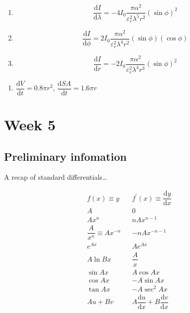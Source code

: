 \documentclass[
]{book}
\providecommand{\tightlist}{%
  \setlength{\itemsep}{0pt}\setlength{\parskip}{0pt}}
\begin{document}
\begin{enumerate}
\def\labelenumi{\alph{enumi}.}
\tightlist
\item
  \begin{equation*}
  \dfrac{\textrm{d}I}{\textrm{d}\lambda}= -4I_0 \frac{\pi \alpha ^2}{\varepsilon _r^2 \lambda^5 r^2}(\sin \phi)^2
  \end{equation*}
\item
  \begin{equation*}
  \dfrac{\textrm{d}I}{\textrm{d}\phi}= 2I_0 \frac{\pi \alpha ^2}{\varepsilon _r^2 \lambda^4 r^2}(\sin \phi)(\cos \phi)
  \end{equation*}
\item
  \begin{equation*}
  \dfrac{\textrm{d}I}{\textrm{d}r}= -2I_0 \frac{\pi \alpha ^2}{\varepsilon _r^2 \lambda^4 r^3}(\sin \phi)^2
  \end{equation*}
\end{enumerate}

\begin{enumerate}
\def\labelenumi{\arabic{enumi}.}
\setcounter{enumi}{2}
\tightlist
\item
  \(\dfrac{\textrm{d}V}{\textrm{d}t}= 0.8 \pi r^2\), \(\dfrac{\textrm{d}SA}{\textrm{d}t}=1.6 \pi r\)
\end{enumerate}

\hypertarget{ch:Workshop5}{%
\chapter{Week 5}\label{ch:Workshop5}}

\hypertarget{sec:Prelim5}{%
\section{Preliminary infomation}\label{sec:Prelim5}}

A recap of standard differentials\ldots{}

\begin{equation*}
\begin{array}{ccc}
  f(x) \equiv y & & f^{\prime}(x) \equiv \dfrac{\textrm{d}y}{\textrm{d}x}\\
  \hline
A & &0 \\
 Ax^n & &nAx^{n-1} \\
 \dfrac{A}{x^n} \equiv A x^{-n} & &-nA x^{-n-1} \\
e^{Ax} & &Ae^{Ax} \\
A \ln Bx & &\dfrac{A}{x} \\
\sin Ax & &A\cos Ax \\
\cos Ax & &-A\sin Ax \\
\tan Ax & &-A\sec^2 Ax \\
Au + Bv & &A\dfrac{\textrm{d}u}{\textrm{d}x} + B\dfrac{\textrm{d}v}{\textrm{d}x} \\
\end{array}
\end{equation*}
\end{document}
